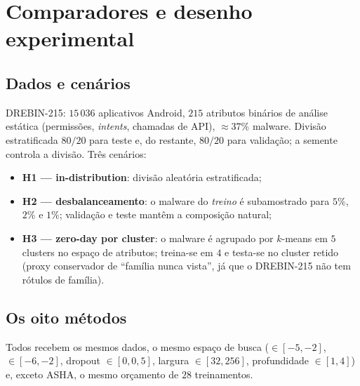 \section{Comparadores e desenho experimental}\label{sec:experimental}

\subsection{Dados e cenários}
DREBIN-215: $15\,036$ aplicativos Android, $215$ atributos binários de análise estática (permissões, \emph{intents}, chamadas de API), $\approx37\%$ malware. Divisão estratificada $80/20$ para teste e, do restante, $80/20$ para validação; a semente controla a divisão. Três cenários:
\begin{itemize}
\item \textbf{H1 --- in-distribution}: divisão aleatória estratificada;
\item \textbf{H2 --- desbalanceamento}: o malware do \emph{treino} é subamostrado para $5\%$, $2\%$ e $1\%$; validação e teste mantêm a composição natural;
\item \textbf{H3 --- zero-day por cluster}: o malware é agrupado por $k$-means em $5$ clusters no espaço de atributos; treina-se em $4$ e testa-se no cluster retido (proxy conservador de ``família nunca vista'', já que o DREBIN-215 não tem rótulos de família).
\end{itemize}

\subsection{Os oito métodos}
Todos recebem os mesmos dados, o mesmo espaço de busca ($\in[-5,-2]$, $\in[-6,-2]$, dropout $\in[0,0{,}5]$, largura $\in[32,256]$, profundidade $\in[1,4]$) e, exceto ASHA, o mesmo orçamento de $28$ treinamentos.

